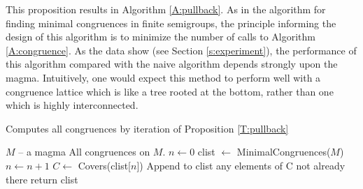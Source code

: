 \documentclass{acmconf}
\begin{document}


This proposition results in Algorithm \ref{A:pullback}.  
As in the algorithm for finding minimal congruences
in finite semigroups, the principle informing the design of this 
algorithm is to minimize the number of calls to Algorithm \ref{A:congruence}.
As the data show (see Section \ref{s:experiment}), the performance of 
this algorithm  compared with the naive algorithm depends strongly upon
the magma. Intuitively, one would expect this method
to perform well with a congruence lattice which is like 
a tree rooted at the bottom, rather than one which is highly 
interconnected. 


\begin{algorithm}
\caption{Computes all congruences by iteration of Proposition 
\ref{T:pullback} }
\label{A:pullback}
\begin{algorithmic}[1]
\REQUIRE $M$ -- a magma
\ENSURE All congruences on $M$.
\STATE $n \leftarrow 0$ 
\STATE clist $\leftarrow $ MinimalCongruences($M$)
		\STATE $n \leftarrow n + 1$
		\STATE $C \leftarrow$ Covers(clist[$n$]) 
		\STATE Append to clist any elements of C not already there
\ENDWHILE
\STATE return clist
\end{algorithmic}
\end{algorithm}
\end{document}
